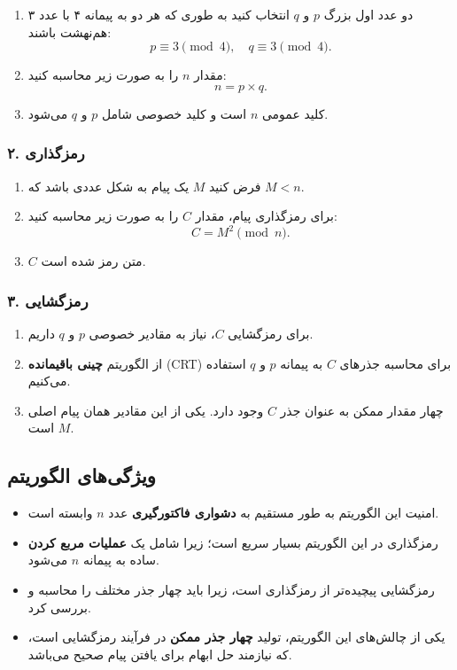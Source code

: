 \documentclass{report}
\begin{document}
\begin{enumerate}
    \item دو عدد اول بزرگ \( p \) و \( q \) انتخاب کنید به طوری که هر دو به پیمانه ۴ با عدد ۳ هم‌نهشت باشند:
    \[
    p \equiv 3 \pmod{4}, \quad q \equiv 3 \pmod{4}.
    \]
    \item مقدار \( n \) را به صورت زیر محاسبه کنید:
    \[
    n = p \times q.
    \]
    \item کلید عمومی \textbf{\( n \)} است و کلید خصوصی شامل \( p \) و \( q \) می‌شود.
\end{enumerate}

\subsubsection*{۲. رمزگذاری}

\begin{enumerate}
    \item فرض کنید \( M \) یک پیام به شکل عددی باشد که \( M < n \).
    \item برای رمزگذاری پیام، مقدار \( C \) را به صورت زیر محاسبه کنید:
    \[
    C = M^2 \pmod{n}.
    \]
    \item \( C \) متن رمز شده است.
\end{enumerate}

\subsubsection*{۳. رمزگشایی}

\begin{enumerate}
    \item برای رمزگشایی \( C \)، نیاز به مقادیر خصوصی \( p \) و \( q \) داریم.
    \item از الگوریتم \textbf{چینی باقیمانده} (CRT) برای محاسبه جذرهای \( C \) به پیمانه \( p \) و \( q \) استفاده می‌کنیم.
    \item چهار مقدار ممکن به عنوان جذر \( C \) وجود دارد. یکی از این مقادیر همان پیام اصلی \( M \) است.
\end{enumerate}

\subsection*{ویژگی‌های الگوریتم}

\begin{itemize}
    \item امنیت این الگوریتم به طور مستقیم به \textbf{دشواری فاکتورگیری} عدد \( n \) وابسته است.
    \item رمزگذاری در این الگوریتم بسیار سریع است؛ زیرا شامل یک \textbf{عملیات مربع کردن} ساده به پیمانه \( n \) می‌شود.
    \item رمزگشایی پیچیده‌تر از رمزگذاری است، زیرا باید چهار جذر مختلف را محاسبه و بررسی کرد.
    \item یکی از چالش‌های این الگوریتم، تولید \textbf{چهار جذر ممکن} در فرآیند رمزگشایی است، که نیازمند حل ابهام برای یافتن پیام صحیح می‌باشد.
\end{itemize}
\end{document}
